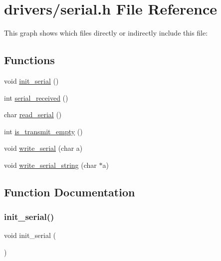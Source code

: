\hypertarget{a00059}{}\section{drivers/serial.h File Reference}
\label{a00059}
This graph shows which files directly or indirectly include this file\+:
\subsection*{Functions}
\begin{DoxyCompactItemize}
\item 
void \hyperlink{a00059_acfb6f6d615183fc2f71e79dfbadfe27d_acfb6f6d615183fc2f71e79dfbadfe27d}{init\+\_\+serial} ()
\item 
int \hyperlink{a00059_af10f0e64ba89e8635aa7245ca08297c5_af10f0e64ba89e8635aa7245ca08297c5}{serial\+\_\+received} ()
\item 
char \hyperlink{a00059_ad343a7018f74662f794968dfa0523841_ad343a7018f74662f794968dfa0523841}{read\+\_\+serial} ()
\item 
int \hyperlink{a00059_a01fe5504f7b8f4eee1545737495bae76_a01fe5504f7b8f4eee1545737495bae76}{is\+\_\+transmit\+\_\+empty} ()
\item 
void \hyperlink{a00059_aac3c84e21fffc4696d8969ca6955bfc8_aac3c84e21fffc4696d8969ca6955bfc8}{write\+\_\+serial} (char a)
\item 
void \hyperlink{a00059_aabbe45d6670f606c53ba38a5fb14b650_aabbe45d6670f606c53ba38a5fb14b650}{write\+\_\+serial\+\_\+string} (char $\ast$a)
\end{DoxyCompactItemize}


\subsection{Function Documentation}
\mbox{\label{a00059_acfb6f6d615183fc2f71e79dfbadfe27d_acfb6f6d615183fc2f71e79dfbadfe27d}} 
\subsubsection{\texorpdfstring{init\+\_\+serial()}{init\_serial()}}
{\footnotesize\ttfamily void init\+\_\+serial (\begin{DoxyParamCaption}{ }\end{DoxyParamCaption})}



